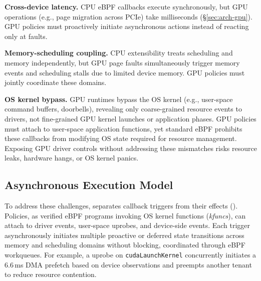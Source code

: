 \textbf{Cross-device latency.}
CPU eBPF callbacks execute synchronously, but GPU operations (e.g., page migration across PCIe) take milliseconds (\S\ref{sec:arch-gpu}).
GPU policies must proactively initiate asynchronous actions instead of reacting only at faults.

\textbf{Memory-scheduling coupling.}
CPU extensibility treats scheduling and memory independently, but GPU page faults simultaneously trigger memory events and scheduling stalls due to limited device memory.
GPU policies must jointly coordinate these domains.

\textbf{OS kernel bypass.}
GPU runtimes bypass the OS kernel (e.g., user-space command buffers, doorbells), revealing only coarse-grained resource events to drivers, not fine-grained GPU kernel launches or application phases.
GPU policies must attach to user-space application functions, yet standard eBPF prohibits these callbacks from modifying OS state required for resource management.
Exposing GPU driver controls without addressing these mismatches risks resource leaks, hardware hangs, or OS kernel panics.

\subsection{Asynchronous Execution Model}
\label{sec:exec-model}

To address these challenges, \sys{} separates callback triggers from their effects ().
Policies, as verified eBPF programs invoking OS kernel functions (\emph{kfuncs}), can attach to driver events, user-space uprobes, and device-side events.
Each trigger asynchronously initiates multiple proactive or deferred state transitions across memory and scheduling domains without blocking, coordinated through eBPF workqueues.
For example, a uprobe on \texttt{cudaLaunchKernel} concurrently initiates a 6.6\,ms DMA prefetch based on device observations and preempts another tenant to reduce resource contention.

